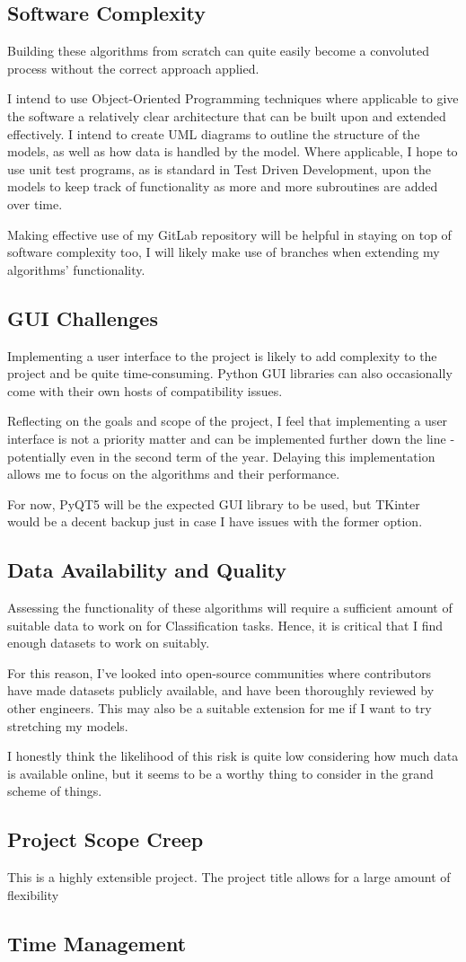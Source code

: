 \documentclass[report,10pt]{article}
\begin{document}
\subsection{Software Complexity}
Building these algorithms from scratch can quite easily become a convoluted process without the correct approach applied. \par
I intend to use Object-Oriented Programming techniques where applicable to give the software a relatively clear architecture that can be built upon and extended effectively. I intend to create UML diagrams to outline the structure of the models, as well as how data is handled by the model. Where applicable, I hope to use unit test programs, as is standard in Test Driven Development, upon the models to keep track of functionality as more and more subroutines are added over time. \par
Making effective use of my GitLab repository will be helpful in staying on top of software complexity too, I will likely make use of branches when extending my algorithms' functionality. \par
\subsection{GUI Challenges}
Implementing a user interface to the project is likely to add complexity to the project and be quite time-consuming. Python GUI libraries can also occasionally come with their own hosts of compatibility issues. \par
Reflecting on the goals and scope of the project, I feel that implementing a user interface is not a priority matter and can be implemented further down the line - potentially even in the second term of the year. Delaying this implementation allows me to focus on the algorithms and their performance. \par
For now, PyQT5 will be the expected GUI library to be used, but TKinter~\cite{tkinter} would be a decent backup just in case I have issues with the former option.
\subsection{Data Availability and Quality}
Assessing the functionality of these algorithms will require a sufficient amount of suitable data to work on for Classification tasks. Hence, it is critical that I find enough datasets to work on suitably. \par
For this reason, I've looked into open-source communities where contributors have made datasets publicly available, and have been thoroughly reviewed by other engineers. This may also be a suitable extension for me if I want to try stretching my models. \par
I honestly think the likelihood of this risk is quite low considering how much data is available online, but it seems to be a worthy thing to consider in the grand scheme of things. \par
\subsection{Project Scope Creep}
This is a highly extensible project. The project title allows for a large amount of flexibility
\subsection{Time Management}

\pagebreak


\end{document}
